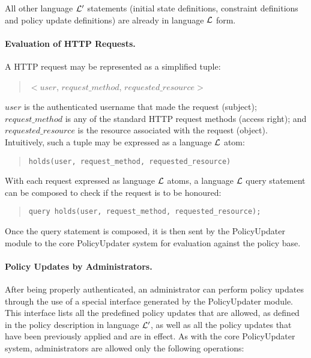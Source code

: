 \documentclass[11pt]{llncs}
\begin{document}
        All other language ${\cal L'}$ statements (initial state definitions,
        constraint definitions and policy update definitions) are already in
        language ${\cal L}$ form.

      \paragraph{\bf Evaluation of HTTP Requests.}

        A HTTP request may be represented as a simplified tuple:

        \begin{quote}
          $<$$user$, $request\_method$, $requested\_resource$$>$
        \end{quote}

        $user$ is the authenticated username that made the request (subject);
        $request\_method$ is any of the standard HTTP request methods (access
        right); and $requested\_resource$ is the resource associated with the
        request (object). Intuitively, such a tuple may be expressed as a
        language ${\cal L}$ atom:

        \begin{quote}
          \begin{verbatim}holds(user, request_method, requested_resource)\end{verbatim}
        \end{quote}

        With each request expressed as language ${\cal L}$ atoms, a language
        ${\cal L}$ query statement can be composed to check if the request is
        to be honoured:

        \begin{quote}
          \begin{verbatim}query holds(user, request_method, requested_resource);\end{verbatim}
        \end{quote}

        Once the query statement is composed, it is then sent by the
        PolicyUpdater module to the core PolicyUpdater system for evaluation
        against the policy base.

      \paragraph{\bf Policy Updates by Administrators.}

        After being properly authenticated, an administrator can perform policy
        updates through the use of a special interface generated by the
        PolicyUpdater module. This interface lists all the predefined policy
        updates that are allowed, as defined in the policy description in
        language ${\cal L'}$, as well as all the policy updates that have been
        previously applied and are in effect. As with the core PolicyUpdater
        system, administrators are allowed only the following operations:
\end{document}
